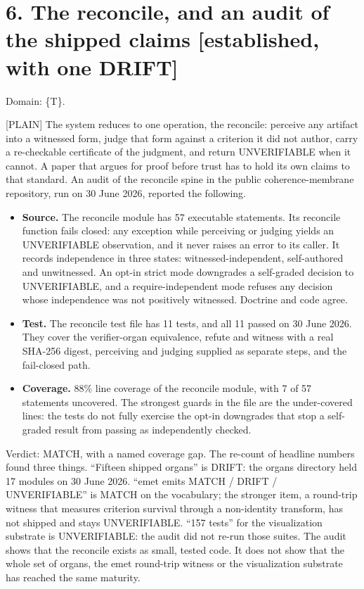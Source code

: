 \documentclass[11pt]{article}
\newcommand{\register}[1]{{\ttfamily\small #1}}
\begin{document}
\section*{6. The reconcile, and an audit of the shipped claims [established, with one DRIFT]}

Domain: \{T\}.

\register{[PLAIN]} The system reduces to one operation, the reconcile: perceive any artifact into a witnessed form, judge that form against a criterion it did not author, carry a re-checkable certificate of the judgment, and return UNVERIFIABLE when it cannot. A paper that argues for proof before trust has to hold its own claims to that standard. An audit of the reconcile spine in the public coherence-membrane repository, run on 30 June 2026, reported the following.

\begin{itemize}
\item \textbf{Source.} The reconcile module has 57 executable statements. Its reconcile function fails closed: any exception while perceiving or judging yields an UNVERIFIABLE observation, and it never raises an error to its caller. It records independence in three states: witnessed-independent, self-authored and unwitnessed. An opt-in strict mode downgrades a self-graded decision to UNVERIFIABLE, and a require-independent mode refuses any decision whose independence was not positively witnessed. Doctrine and code agree.
\item \textbf{Test.} The reconcile test file has 11 tests, and all 11 passed on 30 June 2026. They cover the verifier-organ equivalence, refute and witness with a real SHA-256 digest, perceiving and judging supplied as separate steps, and the fail-closed path.
\item \textbf{Coverage.} 88\% line coverage of the reconcile module, with 7 of 57 statements uncovered. The strongest guards in the file are the under-covered lines: the tests do not fully exercise the opt-in downgrades that stop a self-graded result from passing as independently checked.
\end{itemize}
Verdict: MATCH, with a named coverage gap. The re-count of headline numbers found three things. ``Fifteen shipped organs'' is DRIFT: the organs directory held 17 modules on 30 June 2026. ``emet emits MATCH /\allowbreak{} DRIFT /\allowbreak{} UNVERIFIABLE'' is MATCH on the vocabulary; the stronger item, a round-trip witness that measures criterion survival through a non-identity transform, has not shipped and stays UNVERIFIABLE. ``157 tests'' for the visualization substrate is UNVERIFIABLE: the audit did not re-run those suites. The audit shows that the reconcile exists as small, tested code. It does not show that the whole set of organs, the emet round-trip witness or the visualization substrate has reached the same maturity.
\end{document}

